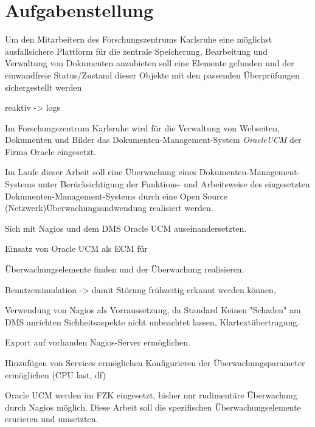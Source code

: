 \section{Aufgabenstellung}

Um den Mitarbeitern des Forschungszentrums Karlsruhe eine möglichst ausfallsichere Plattform für die zentrale Speicherung, Bearbeitung und Verwaltung von Dokumenten anzubieten soll eine Elemente gefunden und der einwandfreie Status/Zustand dieser Objekte mit den passenden Überprüfungen sichergestellt werden 

reaktiv -> logs


Im Forschungszentrum Karlsruhe wird für die Verwaltung von Webseiten, Dokumenten und Bilder das Dokumenten-Management-System \textit{\gls{OracleUCM}} der Firma Oracle  eingesetzt.

Im Laufe dieser Arbeit soll eine Überwachung eines Dokumenten-Management-Systems unter Berücksichtigung der Funktions- und Arbeitsweise des eingesetzten Dokumenten-Management-Systems durch eine Open Source (Netzwerk)Überwachungsandwendung realisiert werden.

Sich mit Nagios und dem DMS Oracle UCM auseinandersetzten.

Einsatz von Oracle UCM als ECM für 

Überwachungselemente finden und der Überwachung realisieren.

Benutzersimulation -> damit Störung frühzeitig erkannt werden können,

Verwendung von Nagios als Vorraussetzung, da Standard
Keinen "Schaden" am DMS anrichten
Sichheitsaspekte nicht unbeachtet lassen, Klartextübertragung.

Export auf vorhanden Nagios-Server ermöglichen.

Hinzufügen von Services ermöglichen
Konfigurieren der Überwachungsparameter ermöglichen (CPU last, df)

Oracle UCM werden im FZK eingesetzt, bisher nur rudimentäre Überwachung durch Nagios möglich.
Diese Arbeit soll die spezifischen Überwachungselemente erurieren und umsetzten.